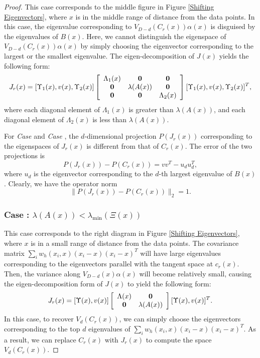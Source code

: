 \documentclass[aos,preprint]{imsart}
\theoremstyle{remark}
\begin{document}
\begin{appendix}
\begin{proof}
This case corresponds to the middle figure in {Figure \ref{Shifting Eigenvectors}}, where $x$ is in the middle range of distance from the data points. In this case, the eigenvalue corresponding to $V_{D-d}(C_r(x))\alpha(x)$ is disguised by the eigenvalues of $B(x)$. Here, we cannot distinguish the eigenspace of $V_{D-d}(C_r(x))\alpha(x)$ by simply choosing the eigenvector corresponding to the largest or the smallest eigenvalue. The eigen-decomposition of $J(x)$ yields the following form:
\begin{equation}\label{SVD2}
J_r (x)= [\Upsilon_1(x), v(x), \Upsilon_2(x)] 
\left[
\begin{array}{ccc}
\Lambda_1(x) & \bf 0 & \bf 0\\
\bf 0 &\lambda(A(x)) &\bf 0 \\
\bf 0 &\bf 0  &\Lambda_2(x) \\
\end{array}
\right][\Upsilon_1(x), v(x), \Upsilon_2(x)]^T,
\end{equation}
where each diagonal element of $\Lambda_1(x)$ is greater than $\lambda(A(x))$, and each diagonal element of $\Lambda_2(x)$ is less than $\lambda(A(x))$.

For {\it Case {}} and {\it Case },  the $d$-dimensional projection $P(J_r(x))$ corresponding to the eigenspaces of $J_r(x)$ is different from that of $C_r(x)$. The error of the two projections is
\[
P(J_r(x)) - P(C_r(x)) = v v^T - u_du_d^T,
\]
where $u_d$ is the eigenvector corresponding to the $d$-th largest eigenvalue of $B(x)$. Clearly, we have the operator norm
\[
\| P(J_r(x)) - P(C_r(x)) \|_2 = 1.
\]

\subsubsection*{Case : $\lambda(A(x))<\lambda_{\min} (\Xi(x))$ }

This case corresponds to the right diagram in {Figure \ref{Shifting Eigenvectors}}, where $x$ is in a small range of distance from the data points. The covariance matrix $\sum_i w_h(x_i, x)(x_i-x)(x_i-x)^T$ will have large eigenvalues corresponding to the eigenvectors parallel with the tangent space at $c_r(x)$. Then, the variance along $V_{D-d}(x)\alpha(x)$ will become relatively small, causing the eigen-decomposition form of $J(x)$ to yield the following form:
\begin{equation}\label{SVD3}
J_r (x)= [\Upsilon(x),v(x)] 
\left[
\begin{array}{cc}
\Lambda(x) & \bf 0\\
\bf 0 &\lambda(A(x))
\end{array}
\right][\Upsilon(x), v(x)]^T.
\end{equation}
In this case, to recover $V_d(C_r(x))$, we can simply choose the eigenvectors corresponding to the top $d$ eigenvalues of $\sum_i w_h(x_i, x)(x_i-x)(x_i-x)^T$. As a result, we can replace $C_r(x)$ with $J_r(x)$ to compute the space $V_d(C_r(x))$.


\end{proof}
\end{appendix}
\end{document}
